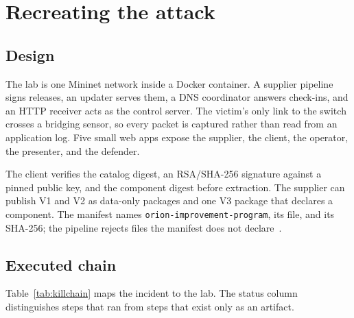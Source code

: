 \section{Recreating the attack}
\label{sec:recreation}

\subsection{Design}

The lab is one Mininet network inside a Docker container. A supplier pipeline signs releases, an updater serves them, a DNS coordinator answers check-ins, and an HTTP receiver acts as the control server. The victim's only link to the switch crosses a bridging sensor, so every packet is captured rather than read from an application log. Five small web apps expose the supplier, the client, the operator, the presenter, and the defender.

The client verifies the catalog digest, an RSA/SHA-256 signature against a pinned public key, and the component digest before extraction. The supplier can publish V1 and V2 as data-only packages and one V3 package that declares a component. The manifest names \texttt{orion-improvement-program}, its file, and its SHA-256; the pipeline rejects files the manifest does not declare~\cite{task05lab}.

\subsection{Executed chain}

Table~\ref{tab:killchain} maps the incident to the lab. The status column distinguishes steps that ran from steps that exist only as an artifact.

